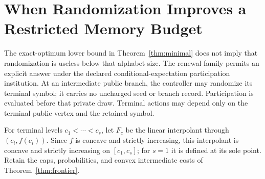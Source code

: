 \section{When Randomization Improves a Restricted Memory Budget}\label{sec:r33-random}
The exact-optimum lower bound in Theorem~\ref{thm:minimal} does not imply that randomization is useless below that alphabet size. The renewal family permits an explicit answer under the declared conditional-expectation participation institution. At an intermediate public branch, the controller may randomize its terminal symbol; it carries no uncharged seed or branch record. Participation is evaluated before that private draw. Terminal actions may depend only on the terminal public vertex and the retained symbol.

For terminal levels $c_1<\cdots<c_s$, let $F_c$ be the linear interpolant through $(c_i,f(c_i))$. Since $f$ is concave and strictly increasing, this interpolant is concave and strictly increasing on $[c_1,c_s]$; for $s=1$ it is defined at its sole point. Retain the caps, probabilities, and convex intermediate costs of Theorem~\ref{thm:frontier}.

